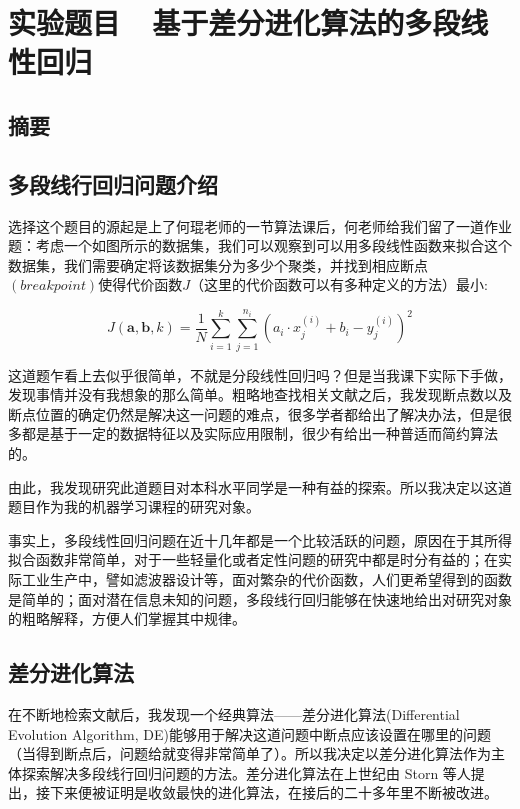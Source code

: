 \section{实验题目\ \ 基于差分进化算法的多段线性回归}
\subsection{摘要}


\subsection{多段线行回归问题介绍}

选择这个题目的源起是上了何琨老师的一节算法课后，何老师给我们留了一道作业题：考虑一个如图所示的数据集，我们可以观察到可以用多段线性函数来拟合这个数据集，我们需要确定将该数据集分为多少个聚类，并找到相应断点$(breakpoint)$使得代价函数$J$（这里的代价函数可以有多种定义的方法）最小:

\[J(\bm{a}, \bm{b}, k) = \frac{1}{N}\sum\limits_{i=1}^k \sum\limits_{j=1}^{n_i}(a_i\cdot x_j^{(i)}+b_i - y_j^{(i)})^2\]

这道题乍看上去似乎很简单，不就是分段线性回归吗？但是当我课下实际下手做，发现事情并没有我想象的那么简单。粗略地查找相关文献之后，我发现断点数以及断点位置的确定仍然是解决这一问题的难点，很多学者都给出了解决办法，但是很多都是基于一定的数据特征以及实际应用限制，很少有给出一种普适而简约算法的。

由此，我发现研究此道题目对本科水平同学是一种有益的探索。所以我决定以这道题目作为我的机器学习课程的研究对象。

事实上，多段线性回归问题在近十几年都是一个比较活跃的问题，原因在于其所得拟合函数非常简单，对于一些轻量化或者定性问题的研究中都是时分有益的；在实际工业生产中，譬如滤波器设计等，面对繁杂的代价函数，人们更希望得到的函数是简单的；面对潜在信息未知的问题，多段线行回归能够在快速地给出对研究对象的粗略解释，方便人们掌握其中规律。


\subsection{差分进化算法}

在不断地检索文献后，我发现一个经典算法——差分进化算法(Differential Evolution Algorithm, DE)能够用于解决这道问题中断点应该设置在哪里的问题（当得到断点后，问题给就变得非常简单了）。所以我决定以差分进化算法作为主体探索解决多段线行回归问题的方法。差分进化算法在上世纪由 Storn 等人提出，接下来便被证明是收敛最快的进化算法，在接后的二十多年里不断被改进。


